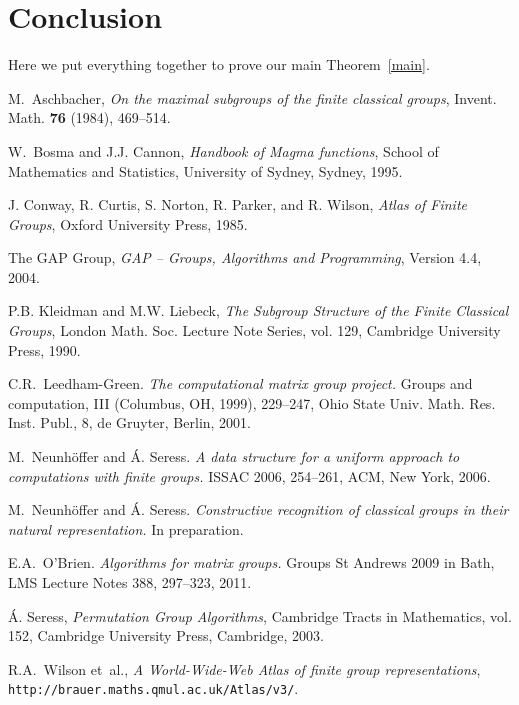 \documentclass[a4paper,11pt]{article}
\begin{document}
\section{Conclusion}

Here we put everything together to prove our main Theorem~\ref{main}.

\begin{thebibliography}{999}

M.~Aschbacher, \emph{On the maximal subgroups of the finite classical groups},
  Invent. Math. \textbf{76} (1984), 469--514.
  
W.~Bosma and J.J. Cannon, \emph{Handbook of {{\sc Magma}} functions}, School of
  Mathematics and Statistics, University of Sydney, Sydney, 1995.

J. Conway, R. Curtis, S. Norton, R. Parker, and R. Wilson, \emph{Atlas of
  {F}inite {G}roups}, Oxford University Press, 1985.
  
The {GAP} Group, \emph{{GAP} -- {G}roups, {A}lgorithms and {P}rogramming}, Version 4.4, 2004.

P.B. Kleidman and M.W. Liebeck, \emph{The {S}ubgroup {S}tructure of the
  {F}inite {C}lassical {G}roups}, London Math. Soc. Lecture Note Series, vol.
  129, Cambridge University Press, 1990.

C.R.~Leedham-Green. \emph{The computational matrix group project.}
  Groups and computation, III (Columbus, OH, 1999), 229--247, 
  Ohio State Univ. Math. Res. Inst. Publ., 8, de Gruyter, Berlin, 2001.

M.~Neunh{\"o}ffer and {\'A}. Seress.
  \emph{A data structure for a uniform approach to computations with finite 
  groups.} ISSAC 2006, 254--261, ACM, New York, 2006. 

M.~Neunh{\"o}ffer and {\'A}. Seress.
\emph{Constructive recognition of classical groups in their natural representation.}
In preparation.

E.A.~O'Brien. \emph{Algorithms for matrix groups.}
    Groups St Andrews 2009 in Bath, LMS Lecture Notes 388, 297--323, 2011.

{\'A}. Seress, \emph{Permutation {G}roup {A}lgorithms}, Cambridge
  Tracts in Mathematics, vol. 152, Cambridge University Press, Cambridge, 2003.
  
R.A.~Wilson et~al., \emph{A {W}orld-{W}ide-{W}eb {A}tlas of finite group
  representations}, {\texttt{http://brauer.maths.qmul.ac.uk/Atlas/v3/}}.


\end{thebibliography}
\end{document}
